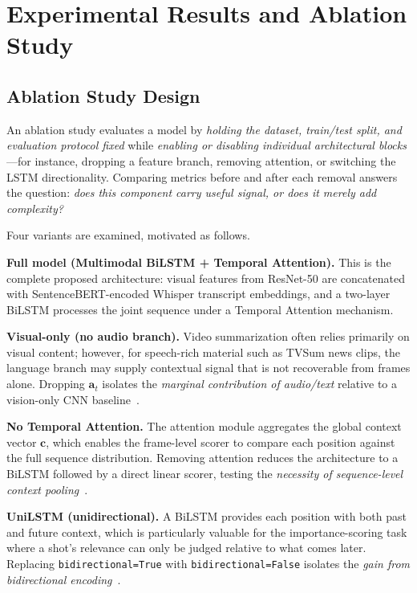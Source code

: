 \documentclass[10pt,conference]{IEEEtran}
\begin{document}
\section{Experimental Results and Ablation Study}
\label{sec:ablation}

\subsection{Ablation Study Design}

An ablation study evaluates a model by \emph{holding the dataset, train/test
split, and evaluation protocol fixed} while \emph{enabling or disabling
individual architectural blocks}---for instance, dropping a feature branch,
removing attention, or switching the LSTM directionality. Comparing metrics
before and after each removal answers the question: \emph{does this component
carry useful signal, or does it merely add complexity?}

Four variants are examined, motivated as follows.

\textbf{Full model (Multimodal BiLSTM + Temporal Attention).}
This is the complete proposed architecture: visual features from ResNet-50 are
concatenated with SentenceBERT-encoded Whisper transcript embeddings, and a
two-layer BiLSTM processes the joint sequence under a Temporal Attention
mechanism.

\textbf{Visual-only (no audio branch).}
Video summarization often relies primarily on visual content; however, for
speech-rich material such as TVSum news clips, the language branch may supply
contextual signal that is not recoverable from frames alone. Dropping
$\mathbf{a}_t$ isolates the \emph{marginal contribution of audio/text} relative
to a vision-only CNN baseline~\cite{zhang2016lstm}.

\textbf{No Temporal Attention.}
The attention module aggregates the global context vector $\mathbf{c}$, which
enables the frame-level scorer to compare each position against the full
sequence distribution. Removing attention reduces the architecture to a
BiLSTM followed by a direct linear scorer, testing the
\emph{necessity of sequence-level context pooling}~\cite{fajtl2018}.

\textbf{UniLSTM (unidirectional).}
A BiLSTM provides each position with both past and future context, which is
particularly valuable for the importance-scoring task where a shot's relevance
can only be judged relative to what comes later. Replacing
\texttt{bidirectional=True} with \texttt{bidirectional=False} isolates the
\emph{gain from bidirectional encoding}~\cite{zhang2016lstm,apostolidis2021pgl}.
\end{document}
